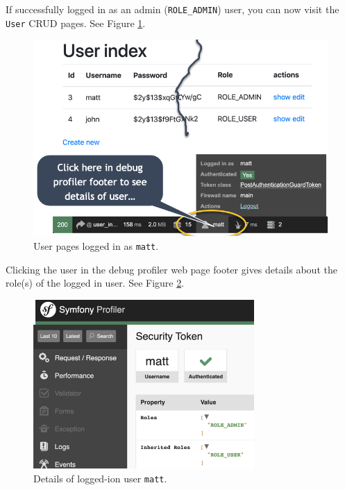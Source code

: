 \documentclass[a4paperpaper,openright]{book}
\begin{document}
If successfully logged in as an admin (\texttt{ROLE\_ADMIN}) user, you
can now visit the \texttt{User} CRUD pages. See Figure \ref{user_matt}.

\begin{figure}
\centering
\includegraphics[width=1\textwidth,height=\textheight]{./tex2pdf.-56818c273b0f887e/84cffeb13f942d54d447415ae700cc1724cc61f3.png}
\caption{User pages logged in as \texttt{matt}. \label{user_matt}}
\end{figure}

Clicking the user in the debug profiler web page footer gives details
about the role(s) of the logged in user. See Figure
\ref{user_matt_details}.

\begin{figure}
\centering
\includegraphics[width=0.75\textwidth,height=\textheight]{./tex2pdf.-56818c273b0f887e/2983cfab1ceb9b17b7d12ec02312c0bd2617b9da.png}
\caption{Details of logged-ion user \texttt{matt}.
\label{user_matt_details}}
\end{figure}
\end{document}
